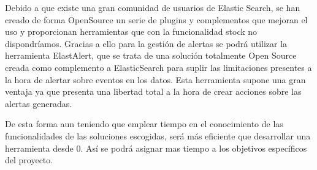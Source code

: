 Debido a que existe una gran comunidad de usuarios de Elastic Search, se han creado de forma OpenSource un serie de plugins y complementos que mejoran el uso y proporcionan herramientas que con la funcionalidad stock no dispondríamos. Gracias a ello para la gestión de alertas se podrá utilizar la herramienta ElastAlert, que se trata de una solución totalmente Open Source creada como complemento a ElasticSearch para suplir las limitaciones presentes a la hora de alertar sobre eventos en los datos. Esta herramienta supone una gran ventaja ya que presenta una libertad total a la hora de crear acciones sobre las alertas generadas.

De esta forma aun teniendo que emplear tiempo en el conocimiento de las funcionalidades de las soluciones escogidas, será más eficiente que desarrollar una herramienta desde 0. Así se podrá asignar mas tiempo a los objetivos específicos del proyecto.